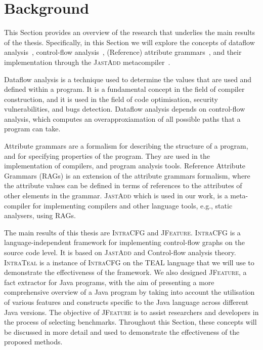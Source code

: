 \section{Background}
\label{sec:background}
This Section provides an overview of the research that 
underlies the main results of the thesis. Specifically, in this Section we will explore
the concepts of dataflow analysis~\cite{aho2007compilers,Nielson2010Principles}, 
control-flow analysis~\cite{allen1970control}, (Reference) attribute grammars~\cite{knuth1968semantics, DBLP:journals/informaticaSI/Hedin00}, 
and their implementation through the \textsc{JastAdd} metacompiler~\cite{DBLP:journals/entcs/HedinM01}.

Dataflow analysis is a technique used to determine the values that are used and 
defined within a program. It is a fundamental concept in the field of compiler 
construction, and it is used in the field of code optimisation, security vulnerabilities, and bugs detection. 
Dataflow analysis depends on control-flow analysis, which computes an overapproxiamation of
all possible paths that a program can take.

Attribute grammars are a formalism for describing the structure of a program, 
and for specifying properties of the program. They are used in the implementation 
of compilers, and program analysis tools.
Reference Attribute Grammars (RAGs) is an extension of the attribute grammars formalism, 
where the attribute values can be defined in terms of references to the attributes 
of other elements in the grammar. \textsc{JastAdd} which is used in our work, is a meta-compiler 
for implementing compilers and other language tools, e.g., static analysers, using RAGs.

The main results of this thesis are \textsc{IntraCFG} and \textsc{JFeature}. 
\textsc{IntraCFG} is a language-independent framework for implementing control-flow graphs 
on the source code level.
It is based on \textsc{JastAdd} and Control-flow analysis theory. \textsc{IntraTeal} is a instance
of \textsc{IntraCFG} on the TEAL language that we will use to demonstrate the effectiveness
of the framework. We also designed \textsc{JFeature}, a fact extractor for Java programs,
with the aim of presenting a more comprehensive overview of a Java program by 
taking into account the utilisation of various features and constructs specific 
to the Java language across different Java versions. The objective of \textsc{JFeature} is
to assist researchers and developers in the process of selecting benchmarks.
Throughout this Section, these concepts will be discussed in more detail and used to 
demonstrate the effectiveness of the proposed methods.


